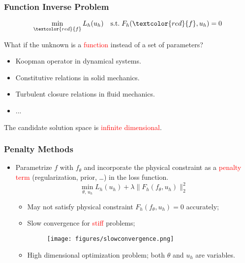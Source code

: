 \documentclass[usenames,dvipsnames]{beamer}
\begin{document}
\begin{frame}
	\frametitle{Function Inverse Problem}
	
	\begin{equation*}
		\min_{\textcolor{red}{f}} L_h(u_h) \quad \mathrm{s.t.}\; F_h(\textcolor{red}{f}, u_h) = 0
	\end{equation*}
	
	What if the unknown is a \textcolor{red}{function} instead of a set of parameters?
\begin{itemize}
	\item Koopman operator in dynamical systems.
	\item Constitutive relations in solid mechanics. 
	\item Turbulent closure relations in fluid mechanics.
	\item ...
\end{itemize}

The candidate solution space is \textcolor{red}{infinite dimensional}.

\end{frame}



\begin{frame}
	\frametitle{Penalty Methods}
	
	\begin{itemize}
		\item Parametrize $f$ with $f_\theta$ and incorporate the physical constraint as a \textcolor{red}{penalty term} (regularization, prior, \ldots) in the loss function.
		\begin{equation*}
			\min_{\theta,\,u_h} L_h(u_h) + \lambda\|F_h(f_\theta, u_h)\|_2^2
		\end{equation*}
		\begin{itemize}
			\item May not satisfy physical constraint $F_h(f_\theta, u_h)=0$ accurately;
			\item Slow convergence for \textcolor{red}{stiff} problems;
			\begin{figure}[hbt]
				\texttt{[image: figures/slowconvergence.png]}
			\end{figure}
			
			
			\item High dimensional optimization problem; both $\theta$ and $u_h$ are variables.
		\end{itemize}
	\end{itemize}
\end{frame}
\end{document}

